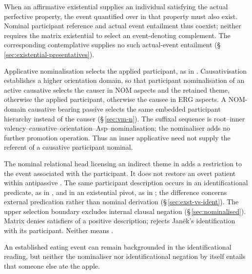 When an affirmative existential supplies an individual satisfying the actual
perfective property, the event quantified over in that property must also
exist. Nominal participant reference and actual event entailment thus coexist;
neither requires the matrix existential to select an event-denoting complement.
The corresponding contemplative supplies no such actual-event entailment
(§\,\ref{sec:existential-presentatives}).

Applicative nominalisation selects the applied participant, as in
 .
Causativisation establishes a higher orientation domain, so that participant
nominalisation of an active causative selects the causer in NOM aspects and
the retained theme, otherwise the applied participant, otherwise the causee in
ERG aspects. A NOM-domain causative bearing passive  selects the
same embedded participant hierarchy instead of the causer
(§\,\ref{sec:vm-n}). The suffixal sequence is root--inner valency--causative--orientation--Asp--nominalisation;
the nominaliser adds no further promotion operation. Thus an inner applicative
need not supply the referent of a causative participant nominal.

\pex
\a {} 
\a {} 
\a {} 
\a {} 
\xe

The nominal relational head licensing an indirect theme in
 adds a restriction to the event associated with the
participant. It does not restore an overt patient within antipassive
. The same participant description occurs in an identificational
predicate, as in , and in an existential pivot,
as in ; the difference concerns external
predication rather than nominal derivation (§\,\ref{sec:exst-vs-ident}).
The upper selection boundary excludes internal clausal negation
(§\,\ref{sec:nominalised}). Matrix 
 denies satisfiers of a positive description;
 rejects Janėk's identification with its
participant. Neither means .

An established eating event can remain backgrounded in the identificational
reading, but neither the nominaliser nor identificational negation by itself
entails that someone else ate the apple.


